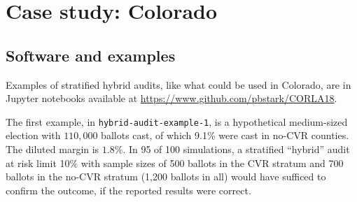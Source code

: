 \documentclass[runningheads]{llncs}
\begin{document}
\section{Case study: Colorado}\label{sec:colorado}

%
%
%


\subsection{Software and examples}
Examples of stratified hybrid audits, like what could be used in Colorado, are in Jupyter notebooks available
at \url{https://www.github.com/pbstark/CORLA18}.

The first example, in \texttt{hybrid-audit-example-1}, is a hypothetical medium-sized election with 
$110,000$ ballots cast, of which 
9.1\% were cast in no-CVR counties. 
The diluted margin is $1.8\%$.
In 95 of 100 simulations, a stratified ``hybrid'' audit at risk limit 10\% with sample sizes of 500 ballots 
in the CVR stratum and 700 ballots in the no-CVR stratum
(1,200 ballots in all)
would have sufficed to confirm the outcome, if the reported results were correct.
\end{document}
